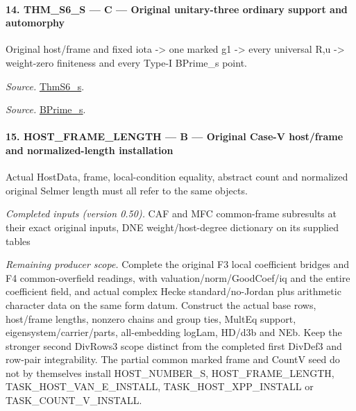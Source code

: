 \paragraph{14. THM\_\allowbreak S6\_\allowbreak S — C — Original unitary-three ordinary support and automorphy}

Original host/frame and fixed iota -> one marked g1 -> every universal R,u -> weight-zero finiteness and every Type-I BPrime\_\allowbreak s point.

\emph{Source.} \href{https://github.com/CocoSgt/riemann-hypothesis-lean/blob/7cbf7a0c32fca1badf05931879a37c3f8a2b03b4/src/Development/AutomorphicArithmetic/AutomorphicVarieties/ModularityArgument/ThresholdArguments/DenseThresholdCases/ThmS6CoreS.lean#L17-L26}{ThmS6\_\allowbreak s}.

\emph{Source.} \href{https://github.com/CocoSgt/riemann-hypothesis-lean/blob/7cbf7a0c32fca1badf05931879a37c3f8a2b03b4/src/Development/AutomorphicArithmetic/AutomorphicVarieties/ModularityArgument/ThresholdArguments/DenseThresholdCases/ThmS6CoreS.lean#L12-L16}{BPrime\_\allowbreak s}.



\paragraph{15. HOST\_\allowbreak FRAME\_\allowbreak LENGTH — B — Original Case-V host/frame and normalized-length installation}

Actual HostData, frame, local-condition equality, abstract count and normalized original Selmer length must all refer to the same objects.

\emph{Completed inputs (version 0.50).} CAF and MFC common-frame subresults at their exact original inputs, DNE weight/host-degree dictionary on its supplied tables

\emph{Remaining producer scope.} Complete the original F3 local coefficient bridges and F4 common-overfield readings, with valuation/norm/GoodCoef/iq and the entire coefficient field, and actual complex Hecke standard/no-Jordan plus arithmetic character data on the same form datum. Construct the actual base rows, host/frame lengths, nonzero chains and group ties, MultEq support, eigensystem/carrier/parts, all-embedding logLam, HD/d3b and NEb. Keep the stronger second DivRows3 scope distinct from the completed first DivDef3 and row-pair integrability. The partial common marked frame and CountV seed do not by themselves install HOST\_\allowbreak NUMBER\_\allowbreak S, HOST\_\allowbreak FRAME\_\allowbreak LENGTH, TASK\_\allowbreak HOST\_\allowbreak VAN\_\allowbreak E\_\allowbreak INSTALL, TASK\_\allowbreak HOST\_\allowbreak XPP\_\allowbreak INSTALL or TASK\_\allowbreak COUNT\_\allowbreak V\_\allowbreak INSTALL.

